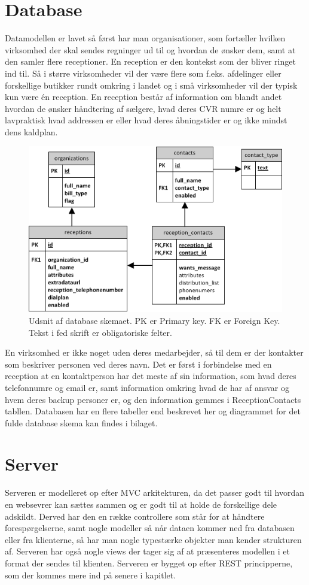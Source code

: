 \section{Database}
Datamodellen er lavet så først har man organisationer, som fortæller hvilken virksomhed der skal sendes regninger ud til og hvordan de ønsker dem, samt at den samler flere receptioner. En reception er den kontekst som der bliver ringet ind til. Så i større virksomheder vil der være flere som f.eks. afdelinger eller forskellige butikker rundt omkring i landet og i små virksomheder vil der typisk kun være én reception. En reception består af information om blandt andet hvordan de ønsker håndtering af sælgere, hvad deres CVR numre er og helt lavpraktisk hvad addressen er eller hvad deres åbningstider er og ikke mindst dens kaldplan. 
\begin{figure}[ht!]
\centering
\includegraphics[scale=0.7]{images/ER_Basic.png}
\caption{Udsnit af database skemaet. PK er Primary key. FK er Foreign Key. Tekst i fed skrift er obligatoriske felter.}
\label{fig:erbasic}
\end{figure}

En virksomhed er ikke noget uden deres medarbejder, så til dem er der kontakter som beskriver personen ved deres navn. Det er først i forbindelse med en reception at en kontaktperson har det meste af sin information, som hvad deres telefonnumre og email er, samt information omkring hvad de har af ansvar og hvem deres backup personer er, og den information gemmes i ReceptionContacts tabllen.
Databasen har en flere tabeller end beskrevet her og diagrammet for det fulde database skema kan findes i bilaget.

\section{Server}
Serveren er modelleret op efter MVC arkitekturen, da det passer godt til hvordan en websevrer kan sættes sammen og er godt til at holde de forskellige dele adskildt. Derved har den en række controllere som står for at håndtere forespørgelserne, samt nogle modeller så når dataen kommer ned fra databasen eller fra klienterne, så har man nogle typestærke objekter man kender strukturen af. Serveren har også nogle views der tager sig af at præsenteres modellen i et format der sendes til klienten. 
Serveren er bygget op efter REST principperne, som der kommes mere ind på senere i kapitlet. 

